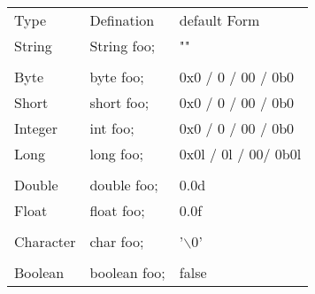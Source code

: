 \documentclass[en, 11pt, xcolor=dvipsnames]{beamer}
\begin{document}
\begin{frame}[fragile]
\begin{columns}[c]
\begin{column}{0.9\textwidth}
			\footnotesize
			\begin{table}
				\begin{tabular}{l l l}
					Type      & Defination   & default Form         \\
					String    & String foo;  & ""                   \\
					          &              &                      \\
					Byte      & byte foo;    & 0x0 / 0 / 00 / 0b0   \\
					Short     & short foo;   & 0x0 / 0 / 00 / 0b0   \\
					Integer   & int foo;     & 0x0 / 0 / 00 / 0b0   \\
					Long      & long foo;    & 0x0l / 0l / 00/ 0b0l \\
					          &              &                      \\
					Double    & double foo;  & 0.0d                 \\
					Float     & float foo;   & 0.0f                 \\
					          &              &                      \\
					Character & char foo;    & '$\backslash0$'      \\
					          &              &                      \\
					Boolean   & boolean foo; & false                \\

				\end{tabular}
			\end{table}


		\end{column}
	\end{columns}

\end{frame}


\end{document}
